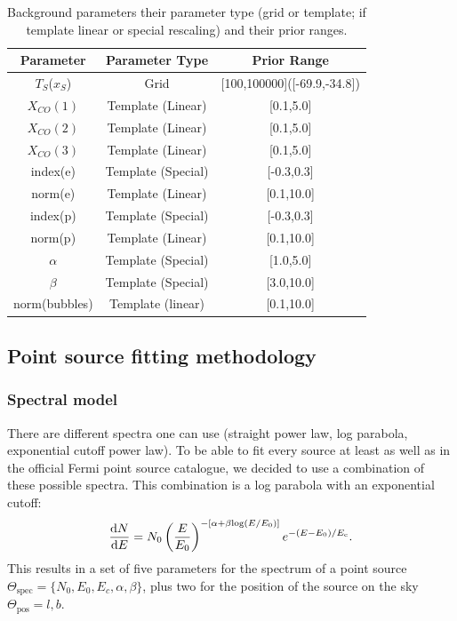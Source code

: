 \documentclass{article}
\begin{document}
\begin{table}[htbp]
\centering
\fontsize{9}{9}\selectfont
\begin{tabular}{|c|c|c|}
\hline
Parameter & Parameter Type & Prior Range \\
\hline
\hline 
$T_S$($x_S$) & Grid & [100,100000]([-69.9,-34.8]) \\
\hline
$X_{CO}(1)$ & Template (Linear) & [0.1,5.0] \\
\hline
$X_{CO}(2)$ & Template (Linear) & [0.1,5.0] \\
\hline
$X_{CO}(3)$ & Template (Linear) & [0.1,5.0] \\
\hline
index(e) & Template (Special) & [-0.3,0.3] \\
\hline
norm(e) & Template (Linear) & [0.1,10.0] \\
\hline
index(p) & Template (Special) & [-0.3,0.3] \\
\hline
norm(p) & Template (Linear) & [0.1,10.0] \\
\hline
$\alpha$ & Template (Special) & [1.0,5.0] \\
\hline
$\beta$ & Template (Special) & [3.0,10.0] \\
\hline
norm(bubbles) & Template (linear) & [0.1,10.0] \\
\hline
\end{tabular}
\caption{\fontsize{9}{9}\selectfont  Background parameters their parameter type (grid or template; if template linear or special rescaling) and their prior ranges.} \label{BG_params}
\end{table}

\subsection{Point source fitting methodology}

\subsubsection{Spectral model}

There are different spectra one can use (straight power law, log parabola, exponential cutoff power law). To be able to fit every source at least as well as in the official Fermi point source catalogue, we decided to use a combination of these possible spectra.  This combination is a log parabola with an exponential cutoff:
\begin{equation*}
\frac{\textnormal{d}N}{\textnormal{d}E} = N_0 \left( \frac{E}{E_0} \right)^{-\left[\alpha + \beta \textnormal{log}(E/E_0)\right]} e^{-(E-E_0)/E_\mathrm{c}}.
\end{equation*}
This results in a set of five parameters for the spectrum of a point source $\Theta_\mathrm{spec} = \{ N_0,E_0,E_c,\alpha,\beta\}$, plus two for the position of the source on the sky $\Theta_\mathrm{pos} = l, b$.
\end{document}
